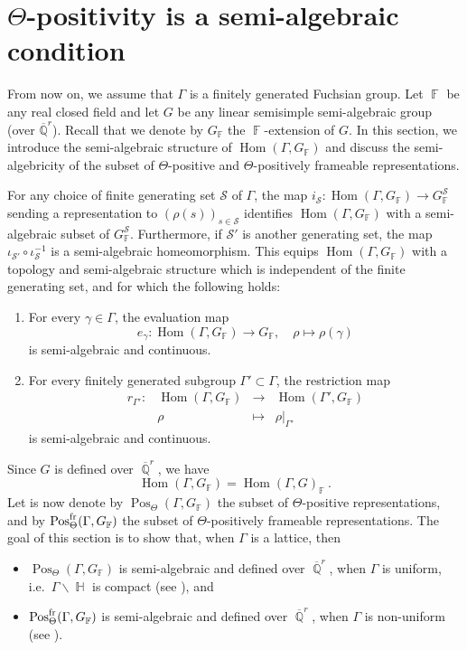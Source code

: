 \documentclass{amsart}
\theoremstyle{plain}
\theoremstyle{definition}
\DeclareMathOperator{\Hom}{Hom}
\DeclareMathOperator{\Pos}{Pos}
\DeclareMathOperator{\Fb}{{\mathbb{F}}}
\DeclareMathOperator{\Hb}{\mathbb{H}}
\DeclareMathOperator{\Qb}{\mathbb{Q}}
\newcommand{\fr}{\textnormal{fr}}
\newcommand{\Qbar}{\overline{\Qb}^r}
\newcommand{\1}{\mathbf{1}}
\begin{document}
\section{%
\texorpdfstring{%
$\Theta$-positivity is a semi-algebraic condition}%
{Theta-positivity is a semi-algebraic condition}}
\label{section:Positivitysemi-algebraic}

From now on, we assume that $\Gamma$ is a finitely generated Fuchsian group.
Let $\Fb$ be any real closed field and let $G$ be any linear semisimple semi-algebraic group (over $\overline{\mathbb Q}^r$).
Recall that we denote by $G_{\Fb}$ the $\Fb$-extension of $G$. In this section, we introduce the semi-algebraic structure of $\Hom(\Gamma, G_{\Fb})$ and discuss the semi-algebricity of the subset of $\Theta$-positive and $\Theta$-positively frameable representations.

For any choice of finite generating set $\mathcal S$ of $\Gamma$, the map $i_{\mathcal S}: \Hom(\Gamma,G_{\Fb}) \to G_{\Fb}^{\mathcal S}$ sending a representation to $(\rho(s))_{s\in \mathcal S}$ identifies $\Hom(\Gamma, G_{\Fb})$ with a semi-algebraic subset of $G_{\Fb}^{\mathcal S}$. Furthermore, if $\mathcal S'$ is another generating set, the map $\iota_{\mathcal S'} \circ \iota_{\mathcal S}^{-1}$ is a semi-algebraic homeomorphism. This equips $\Hom(\Gamma, G_{\Fb})$ with a topology and semi-algebraic structure which is independent of the finite generating set, and for which the following holds:
\begin{enumerate}
\item For every $\gamma\in\Gamma$, the evaluation map 
\[e_\gamma:\Hom(\Gamma,G_{\Fb})\to G_{\Fb}, \quad \rho\mapsto\rho(\gamma)\]
is semi-algebraic and continuous.
\item For every finitely generated subgroup $\Gamma'\subset\Gamma$, the restriction map
\[
\begin{array}{cccc}
r_{\Gamma'}: &\Hom(\Gamma,G_{\Fb})& \to &\Hom(\Gamma',G_{\Fb})\\
&\rho & \mapsto & \rho\vert_{ \Gamma'}
\end{array}
\]
is semi-algebraic and continuous.
\end{enumerate}

Since $G$ is defined over $\Qbar$, we have 
\[\Hom(\Gamma,G_{\Fb}) = \Hom(\Gamma,G)_{\Fb}~.\]
Let is now denote by $\Pos_\Theta(\Gamma,G_{\Fb})$ the subset of $\Theta$-positive representations, and by $\Pos_\Theta^{\fr}(\Gamma,G_{\Fb})$ the subset of $\Theta$-positively frameable representations.
The goal of this section is to show that, when $\Gamma$ is a lattice, then
\begin{itemize}
    \item $\Pos_\Theta(\Gamma,G_{\Fb})$ is semi-algebraic and defined over $\Qbar$, when $\Gamma$ is uniform, i.e.\ $\Gamma \backslash \Hb$ is compact (see ), and 
    \item $\Pos_\Theta^{\fr}(\Gamma,G_{\Fb})$ is semi-algebraic and defined over $\Qbar$, when $\Gamma$ is non-uniform (see ).
\end{itemize}
\end{document}
